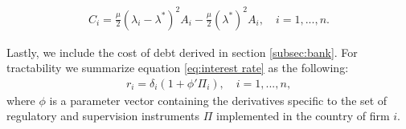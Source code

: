 \documentclass[12pt]{article}
\begin{document}
	\begin{equation}
	\begin{aligned}
	C_i=\frac{\mu}{2}(\lambda_i-\lambda^*)^2A_i-\frac{\mu}{2}(\lambda^*)^2A_i, \quad i=1,...,n.
	\end{aligned}
	\label{eq:agency cost}
	\end{equation}
	
	Lastly, we include the cost of debt derived in section \ref{subsec:bank}. For tractability we summarize equation \ref{eq:interest rate} as the following:
	\begin{equation}
	\begin{aligned}
	r_i=\delta_i(1+\phi'\Pi_i), \quad i=1,...,n,
	\end{aligned}
	\label{eq:cost of debt}
	\end{equation}
	where $\phi$ is a parameter vector containing the derivatives specific to the set of regulatory and supervision instruments $\Pi$ implemented in the country of firm $i$.	
	
\end{document}
